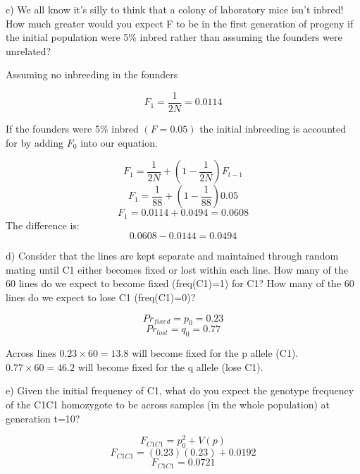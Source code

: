 \documentclass[a4paper, 11pt]{article}
\begin{document}
\begin{enumerate}
\subitem c) We all know it's silly to think that a colony of laboratory mice isn't inbred! How much greater would you expect F to be in the first generation of progeny if the initial population were 5\% inbred rather than assuming the founders were unrelated?

Assuming no inbreeding in the founders 

\[F_1=\frac{1}{2N}=0.0114\]

If the founders were 5\% inbred $(F = 0.05)$ the initial inbreeding is accounted for by adding \(F_0\) into our equation.

\[F_{1}=\frac{1}{2N} + (1-\frac{1}{2N})F_{t-1}\]
\[F_{1}=\frac{1}{88} + (1-\frac{1}{88})0.05\]
\[F_{1}=0.0114 +  0.0494 = 0.0608\]
The difference is: \[0.0608 - 0.0144 = 0.0494\]

\subitem d) Consider that the lines are kept separate and maintained through random mating until C1 either becomes fixed or lost within each line. How many of the 60 lines do we expect to become fixed (freq(C1)=1) for C1? How many of the 60 lines do we expect to lose C1 (freq(C1)=0)?

\[Pr_{fixed} = p_0 = 0.23 \]
\[Pr_{lost} = q_0 = 0.77\]

Across lines \(0.23 \times 60 = 13.8\) will become fixed for the p allele (C1).
\(0.77 \times 60 = 46.2\) will become fixed for the q allele (lose C1).

\subitem e) Given the initial frequency of C1, what do you expect the genotype frequency of the C1C1 homozygote to be across samples (in the whole population) at generation t=10?

\[F_{C1C1}= p_0^2 + V(p)\]
\[F_{C1C1}= (0.23)(0.23) + 0.0192 \]
\[F_{C1C1}= 0.0721 \]









\end{enumerate}
\end{document}
